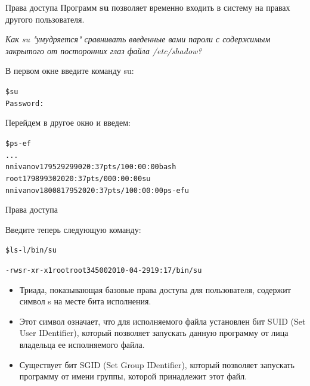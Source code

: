 \documentclass[xcolor=table]{beamer}
\begin{document}
\begin{frame}[fragile]{Права доступа}
	Программ \textbf{su} позволяет временно входить в систему на правах другого пользователя. 

	\textit{Как su "умудряется" сравнивать введенные вами пароли с содержимым закрытого от посторонних глаз файла /etc/shadow? }
	\begin{block}{В первом окне введите команду su:}
		\begin{alltt}
			\$ su
			Password:
		\end{alltt}
	\end{block}
	\begin{block}{Перейдем в другое окно и введем:}
		\begin{alltt}
			\$ ps -ef
			...
			nnivanov 17952 9299 0 20:37 pts/1 00:00:00 bash
			root 17989 9302 0 20:37 pts/0 00:00:00 su
			nnivanov 18008 17952 0 20:37 pts/1 00:00:00 ps -efu
		\end{alltt}
	\end{block}
\end{frame}

\begin{frame}[fragile]{Права доступа}
	\begin{block}{Введите теперь следующую команду:}
		\begin{alltt}
			\$ ls -l /bin/su

			-rwsr-xr-x 1 root root 34500 2010-04-29 19:17 /bin/su
		\end{alltt}
	\end{block}
	\begin{itemize}
		\item Триада, показывающая базовые права доступа для пользователя, содержит символ s на месте бита исполнения. 
		\item Этот символ означает, что для исполняемого файла установлен бит SUID (Set User IDentifier), который позволяет запускать данную 		программу от лица владельца ее исполняемого файла. 
		\item Существует бит SGID (Set Group IDentifier), который позволяет запускать программу от имени группы, которой принадлежит этот файл.
	\end{itemize}
\end{frame}
\end{document}
